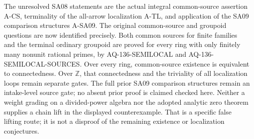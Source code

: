The unresolved SA08 statements are the actual
integral common-source assertion A-CS, terminality
of the all-arrow localization A-TL, and application
of the SA09 comparison structures A-SA09.
The original common-source and groupoid questions are now
identified precisely. Both common sources for finite families
and the terminal ordinary groupoid are proved for every ring
with only finitely many nonunit rational primes, by
AQ-136-SEMILOCAL and AQ-136-SEMILOCAL-SOURCES. Over every
ring, common-source existence is equivalent to connectedness.
Over $\mathbb Z$, that connectedness and the triviality of
all localization loops remain separate gates. The full prior SA09
comparison structures remain an intake-level source gate;
no absent prior proof is claimed checked here.
Neither a weight grading on a divided-power algebra
nor the adopted analytic zero theorem supplies a
chain lift in the displayed counterexample.
That is a specific false lifting route; it is not
a disproof of the remaining existence or
localization conjectures.


